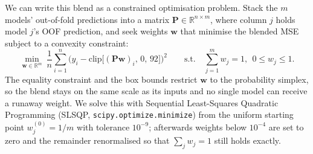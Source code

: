 \documentclass[11pt]{article}
\begin{document}
We can write this blend as a constrained optimisation problem. Stack the $m$ models' out-of-fold predictions into a matrix $\mathbf{P}\in\mathbb{R}^{n\times m}$, where column $j$ holds model $j$'s OOF prediction, and seek weights $\mathbf{w}$ that minimise the blended MSE subject to a convexity constraint:
\[ \min_{\mathbf{w}\in\mathbb{R}^{m}}\ \frac{1}{n}\sum_{i=1}^{n}\Big(y_i-\mathrm{clip}\big[(\mathbf{P}\mathbf{w})_i,\,0,\,92\big]\Big)^{2}\qquad\text{s.t.}\quad \sum_{j=1}^{m}w_j=1,\ \ 0\le w_j\le 1. \]
The equality constraint and the box bounds restrict $\mathbf{w}$ to the probability simplex, so the blend stays on the same scale as its inputs and no single model can receive a runaway weight. We solve this with Sequential Least-Squares Quadratic Programming (SLSQP, \texttt{scipy.optimize.minimize}) from the uniform starting point $w_j^{(0)}=1/m$ with tolerance $10^{-9}$; afterwards weights below $10^{-4}$ are set to zero and the remainder renormalised so that $\sum_j w_j=1$ still holds exactly.
\end{document}
